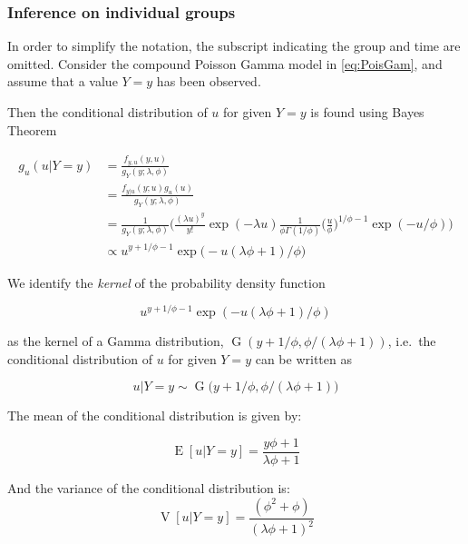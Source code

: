 \documentclass[a4paper,twoside,11pt]{report} %
\DeclareMathOperator{\E}{E}
\DeclareMathOperator{\V}{V}
\DeclareMathOperator{\G}{G}
\theoremstyle{definition}
\theoremstyle{definition}
\theoremstyle{definition}
\theoremstyle{definition}
\theoremstyle{remark}
\begin{document}
\subsubsection{Inference on individual groups}

In order to simplify the notation, the subscript indicating the group and time are omitted. Consider the compound Poisson Gamma model in \eqref{eq:PoisGam}, and assume that a value \(Y=y\) has been observed.

Then the conditional distribution of \(u\) for given \(Y=y\) is found using Bayes Theorem

\begin{equation}
  \begin{aligned}
    g_{u}(u|Y=y)&=\frac{f_{y,u}(y,u)}{g_Y(y;\lambda, \phi)} \\
    &=\frac{f_{y|u}(y;u)g_{u}(u)}{g_{Y}(y;\lambda,\phi)} \\
    &=\frac{1}{g_{Y}(y;\lambda,\phi)}\bigg(\frac{(\lambda u)^y}{y!} \exp (-\lambda u) \frac{1}{\phi \Gamma(1/\phi)} \bigg(\frac{u}{\phi}\bigg)^{1/\phi-1} \exp (-u/\phi)\bigg) \\
    &\propto u^{y+1/\phi-1} \exp \big(- u(\lambda\phi+1)/\phi\big)
  \end{aligned}
\end{equation}

We identify the \emph{kernel} of the probability density function

\begin{equation}
  u^{y+1/\phi-1} \exp (- u(\lambda\phi+1)/\phi)
\end{equation}

as the kernel of a Gamma distribution, \(\G(y+1/\phi,\phi/(\lambda\phi+1))\), i.e.~the conditional distribution of \(u\) for given \(Y=y\) can be written as

\begin{equation}
  u| Y=y\sim \G\big(y+1/\phi,\phi/(\lambda \phi+1)\big)
\end{equation}

The mean of the conditional distribution is given by:

\begin{equation}
  \E[u|Y=y]=\frac{y\phi+1}{\lambda \phi+1}
\end{equation}

And the variance of the conditional distribution is:\\
\begin{equation}
  \V[u|Y=y]=\frac{( \phi^2+\phi)}{(\lambda \phi + 1)^2}
\end{equation}
\end{document}
